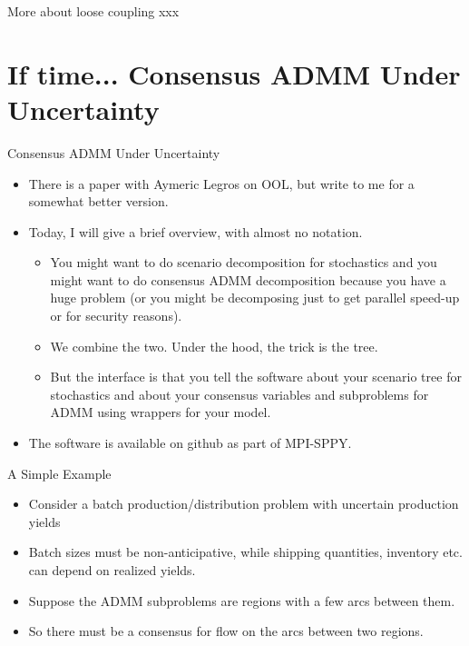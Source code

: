 \documentclass[9pt,usenames,dvipsnames]{beamer}
\begin{document}
\begin{frame}{More about loose coupling}
xxx
\end{frame}

\section{If time... Consensus ADMM Under Uncertainty}

\begin{frame}{Consensus ADMM Under Uncertainty}
  \begin{itemize}
  \item There is a paper with Aymeric Legros on OOL, but write to me for a somewhat better version.
  \item Today, I will give a brief overview, with almost no notation.
    \begin{itemize}
    \item You might want to do scenario decomposition for stochastics and you might want to do consensus ADMM decomposition because you have a huge problem (or you might be decomposing just to get parallel speed-up or for security reasons).
    \item We combine the two. Under the hood, the trick is the tree.
      \item But the interface is that you tell the software about your scenario tree for stochastics and about your consensus variables and subproblems for ADMM using wrappers for your model.
      \end{itemize}
    \item The software is available on github as part of MPI-SPPY.
  \end{itemize}
\end{frame}

\begin{frame}{A Simple Example}
  \begin{itemize}
  \item Consider a batch production/distribution problem with uncertain production yields
  \item Batch sizes must be non-anticipative, while shipping quantities, inventory etc. can depend on realized yields.
  \item Suppose the ADMM subproblems are regions with a few arcs between them.
    \item So there must be a consensus for flow on the arcs between two regions.
  \end{itemize}


\end{frame}
\end{document}
